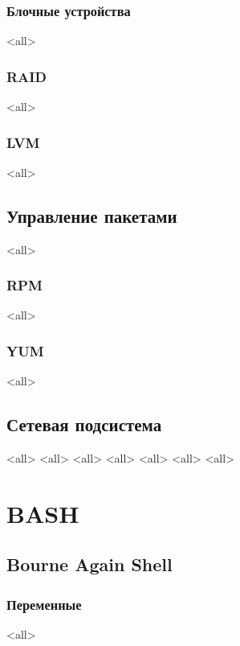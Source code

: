 \section{Блочные устройства}
\mode<all>{}
\section{RAID}
\mode<all>{}
\section{LVM}
\mode<all>{}
\chapter{Управление пакетами}
\mode<all>{}
\section{RPM}
\mode<all>{}
\section{YUM}
\mode<all>{}

\chapter{Сетевая подсистема}
\mode<all>{}
\mode<all>{}
\mode<all>{}
\mode<all>{}
\mode<all>{}
\mode<all>{}
\mode<all>{}

\part{BASH}
\chapter*{Bourne Again Shell}
\section{Переменные}
\mode<all>{}
